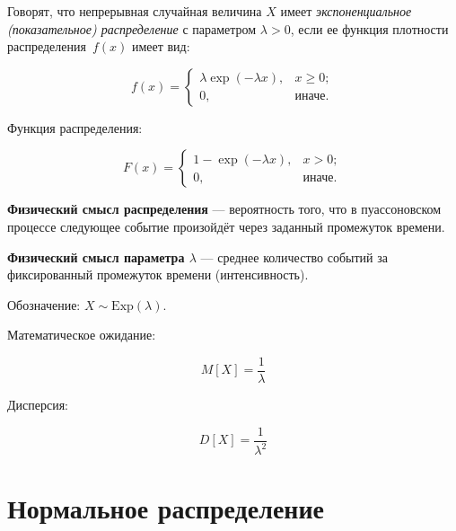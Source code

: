 Говорят, что  непрерывная случайная величина $X$ имеет \textit{экспоненциальное (показательное) распределение} с параметром $\lambda > 0$, если ее функция плотности распределения~$f(x)$ имеет вид:

\begin{equation}
	f(x) =
	\begin{cases}
		\lambda \exp(-\lambda x), & x \ge 0;\\
		0,  & \text{иначе}.
	\end{cases}
\end{equation}

Функция распределения: 

\begin{equation}
	F(x) = 
	\begin{cases}
		1 - \exp(-\lambda x), & x > 0;\\
		0,  & \text{иначе}.
	\end{cases}
\end{equation}

\textbf{Физический смысл распределения} --- вероятность того, что в пуассоновском процессе следующее событие произойдёт через заданный промежуток времени.

\textbf{Физический смысл параметра $\lambda$} --- среднее количество событий за фиксированный промежуток времени (интенсивность).





Обозначение: $X \sim \mathrm{Exp}(\lambda)$.

Математическое ожидание:

\begin{equation}
	M[X] = \frac{1}{\lambda}
\end{equation}

Дисперсия: 

\begin{equation}
	D[X] = \frac{1}{\lambda^2}
\end{equation}

\chapter{Нормальное распределение}

